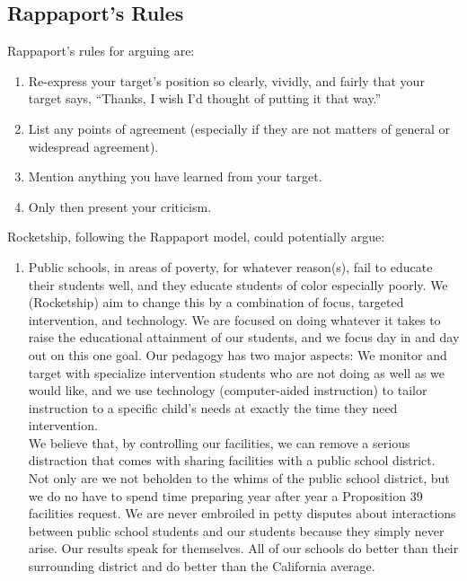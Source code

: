 \subsection{Rappaport's Rules}\label{sec:rappaports-rules}\indent

%
Rappaport's rules for arguing are:
\begin{enumerate}[topsep=0.3\baselineskip,itemsep=0.25\baselineskip]
  \item Re-express your target’s position so clearly, vividly, and fairly that your target says, “Thanks, I wish I’d thought of putting it that way.”
  \item List any points of agreement (especially if they are not matters of general or widespread agreement).
  \item Mention anything you have learned from your target.
  \item Only then present your criticism.
\end{enumerate}
\medskip

Rocketship, following the Rappaport model, could potentially argue:
\begin{enumerate}[topsep=0.3\baselineskip,itemsep=0.25\baselineskip]
  \item Public schools, in areas of poverty, for whatever reason(s), fail to educate their students well, and they educate students of color especially poorly. We (Rocketship) aim to change this by a combination of focus, targeted intervention, and technology. We are focused on doing whatever it takes to raise the educational attainment of our students, and we focus day in and day out on this one goal. Our pedagogy has two major aspects: We monitor and target with specialize intervention students who are not doing as well as we would like, and we use technology (computer-aided instruction) to tailor instruction to a specific child's needs at exactly the time they need intervention.\\ %
  We believe that, by controlling our facilities, we can remove a serious distraction that comes with sharing facilities with a public school district. Not only are we not beholden to the whims of the public school district, but we do no have to spend time preparing year after year a Proposition 39 facilities request. We are never embroiled in petty disputes about interactions between public school students and our students because they simply never arise. Our results speak for themselves. All of our schools do better than their surrounding district and do better than the California average.
\end{enumerate}

